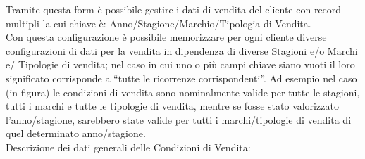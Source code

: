 
Tramite questa form è possibile gestire i dati di vendita del cliente con record multipli la cui chiave è: Anno/Stagione/Marchio/Tipologia di Vendita.\\
Con questa configurazione è possibile memorizzare per ogni cliente diverse configurazioni di dati per la vendita in dipendenza di diverse Stagioni e/o Marchi e/ Tipologie di vendita; nel caso in cui uno o più campi chiave siano vuoti il loro significato corrisponde a “tutte le ricorrenze corrispondenti”. Ad esempio nel caso (in figura) le condizioni di vendita sono nominalmente valide per tutte le stagioni, tutti i marchi e tutte le tipologie di vendita, mentre se fosse stato valorizzato l'anno/stagione, sarebbero state valide per tutti i marchi/tipologie di vendita di quel determinato anno/stagione.\\
Descrizione dei dati generali delle Condizioni di Vendita:

